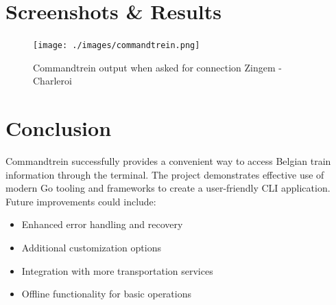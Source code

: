 \documentclass[10pt,a4paper]{article}
\begin{document}
\section{Screenshots \& Results}
\begin{figure}[h]
	\centering
	\texttt{[image: ./images/commandtrein.png]}
	\caption{Commandtrein output when asked for connection Zingem - Charleroi}
	\label{fig:screenshot1}
\end{figure}\section{Conclusion}
Commandtrein successfully provides a convenient way to access Belgian train information through the terminal. The project demonstrates effective use of modern Go tooling and frameworks to create a user-friendly CLI application. Future improvements could include:
\begin{itemize}
	\item Enhanced error handling and recovery
	\item Additional customization options
	\item Integration with more transportation services
	\item Offline functionality for basic operations
\end{itemize}
\end{document}
